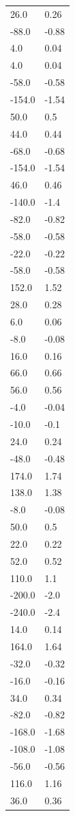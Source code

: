 \begin{longtable}{ll}
26.0 & 0.26 \\
-88.0 & -0.88 \\
4.0 & 0.04 \\
4.0 & 0.04 \\
-58.0 & -0.58 \\
-154.0 & -1.54 \\
50.0 & 0.5 \\
44.0 & 0.44 \\
-68.0 & -0.68 \\
-154.0 & -1.54 \\
46.0 & 0.46 \\
-140.0 & -1.4 \\
-82.0 & -0.82 \\
-58.0 & -0.58 \\
-22.0 & -0.22 \\
-58.0 & -0.58 \\
152.0 & 1.52 \\
28.0 & 0.28 \\
6.0 & 0.06 \\
-8.0 & -0.08 \\
16.0 & 0.16 \\
66.0 & 0.66 \\
56.0 & 0.56 \\
-4.0 & -0.04 \\
-10.0 & -0.1 \\
24.0 & 0.24 \\
-48.0 & -0.48 \\
174.0 & 1.74 \\
138.0 & 1.38 \\
-8.0 & -0.08 \\
50.0 & 0.5 \\
22.0 & 0.22 \\
52.0 & 0.52 \\
110.0 & 1.1 \\
-200.0 & -2.0 \\
-240.0 & -2.4 \\
14.0 & 0.14 \\
164.0 & 1.64 \\
-32.0 & -0.32 \\
-16.0 & -0.16 \\
34.0 & 0.34 \\
-82.0 & -0.82 \\
-168.0 & -1.68 \\
-108.0 & -1.08 \\
-56.0 & -0.56 \\
116.0 & 1.16 \\
36.0 & 0.36 \\

\end{longtable}
